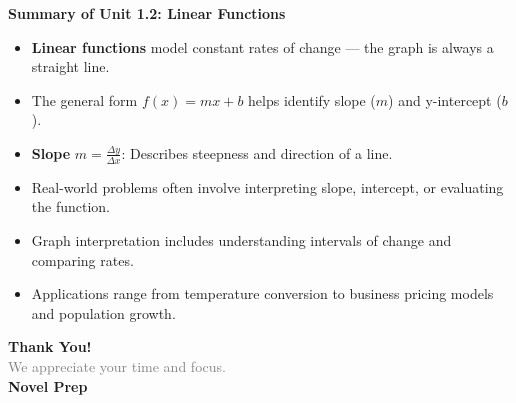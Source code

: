 \documentclass{beamer}
\begin{document}
\begin{frame}{\textbf{Summary of Unit 1.2: Linear Functions}}
    \begin{itemize}
        \item \textbf{Linear functions} model constant rates of change — the graph is always a straight line.
        \item The general form \( f(x) = mx + b \) helps identify slope (\(m\)) and y-intercept (\(b\)).
        \item \textbf{Slope} \( m = \frac{\Delta y}{\Delta x} \): Describes steepness and direction of a line.
        \item Real-world problems often involve interpreting slope, intercept, or evaluating the function.
        \item Graph interpretation includes understanding intervals of change and comparing rates.
        \item Applications range from temperature conversion to business pricing models and population growth.
    \end{itemize}


\end{frame}


\begin{frame}{}

    \centering
    \vspace{5em}

    {\Huge \textbf{\textcolor{novelPurple}{Thank You!}}} \\[1em]
    {\large \textcolor{gray}{We appreciate your time and focus.}} \\[3em]

    {\LARGE \textbf{\textcolor{novelPurple}{\textsf{Novel Prep}}}}

    \vfill
\end{frame}
\end{document}
